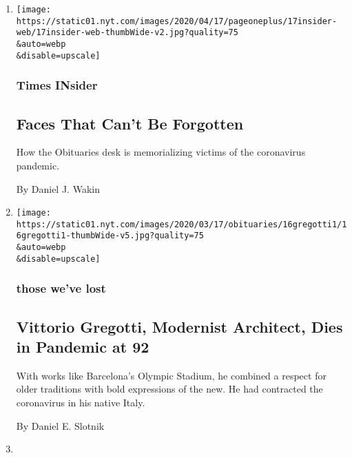 \begin{enumerate}
\def\labelenumi{\arabic{enumi}.}
\item
  \href{/2020/04/16/reader-center/coronavirus-obits.html}{}

  \texttt{[image: https://static01.nyt.com/images/2020/04/17/pageoneplus/17insider-web/17insider-web-thumbWide-v2.jpg?quality=75\\\&auto=webp\\\&disable=upscale]}

  \hypertarget{times-insider}{%
  \subsubsection{Times INsider}\label{times-insider}}

  \hypertarget{faces-that-cant-be-forgotten}{%
  \subsection{Faces That Can't Be
  Forgotten}\label{faces-that-cant-be-forgotten}}

  How the Obituaries desk is memorializing victims of the coronavirus
  pandemic.

  By Daniel J. Wakin
\item
  \href{/2020/03/16/arts/vittorio-gregotti-dies-coronavirus.html}{}

  \texttt{[image: https://static01.nyt.com/images/2020/03/17/obituaries/16gregotti1/16gregotti1-thumbWide-v5.jpg?quality=75\\\&auto=webp\\\&disable=upscale]}

  \hypertarget{those-weve-lost}{%
  \subsubsection{those we've lost}\label{those-weve-lost}}

  \hypertarget{vittorio-gregotti-modernist-architect-dies-in-pandemic-at-92}{%
  \subsection{Vittorio Gregotti, Modernist Architect, Dies in Pandemic
  at
  92}\label{vittorio-gregotti-modernist-architect-dies-in-pandemic-at-92}}

  With works like Barcelona's Olympic Stadium, he combined a respect for
  older traditions with bold expressions of the new. He had contracted
  the coronavirus in his native Italy.

  By Daniel E. Slotnik
\item
  \href{/2020/03/09/arts/music/anton-coppola-dead.html}{}


\end{enumerate}
